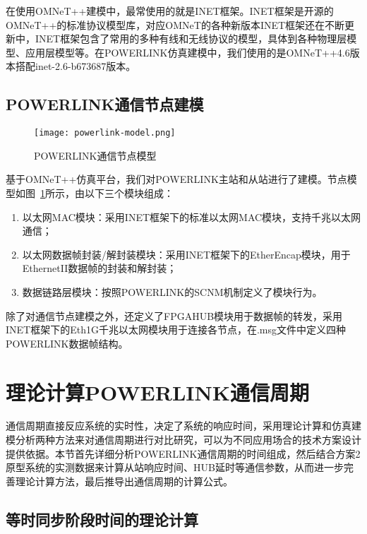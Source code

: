 在使用OMNeT++建模中，最常使用的就是INET框架。INET框架是开源的OMNeT++的标准协议模型库，对应OMNeT的各种新版本INET框架还在不断更新中，INET框架包含了常用的多种有线和无线协议的模型，具体到各种物理层模型、应用层模型等。在POWERLINK仿真建模中，我们使用的是OMNeT++4.6版本搭配inet-2.6-b673687版本。

\subsection{POWERLINK通信节点建模}

\begin{figure}[!htb]
  \centering
  \texttt{[image: powerlink-model.png]}
  \caption{POWERLINK通信节点模型}
  \label{fig:powerlink-model}
\end{figure}
基于OMNeT++仿真平台，我们对POWERLINK主站和从站进行了建模。节点模型如图~\ref{fig:powerlink-model}所示，由以下三个模块组成：

\begin{enumerate}
  \item 以太网MAC模块：采用INET框架下的标准以太网MAC模块，支持千兆以太网通信；
  \item 以太网数据帧封装/解封装模块：采用INET框架下的EtherEncap模块，用于EthernetII数据帧的封装和解封装；
  \item 数据链路层模块：按照POWERLINK的SCNM机制定义了模块行为。
\end{enumerate}

除了对通信节点建模之外，还定义了FPGAHUB模块用于数据帧的转发，采用INET框架下的Eth1G千兆以太网模块用于连接各节点，在.msg文件中定义四种POWERLINK数据帧结构。

\section{理论计算POWERLINK通信周期}

\label{section:理论计算POWERLINK通信周期}
通信周期直接反应系统的实时性，决定了系统的响应时间，采用理论计算和仿真建模分析两种方法来对通信周期进行对比研究，可以为不同应用场合的技术方案设计提供依据。本节首先详细分析POWERLINK通信周期的时间组成，然后结合方案2原型系统的实测数据来计算从站响应时间、HUB延时等通信参数，从而进一步完善理论计算方法，最后推导出通信周期的计算公式。

\subsection{等时同步阶段时间的理论计算}

\label{subsection:等时同步阶段时间的理论计算}

